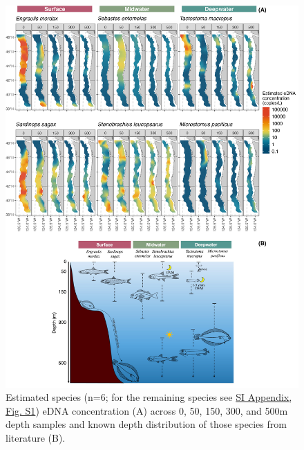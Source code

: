 \documentclass{article}
\begin{document}
\begin{figure}[tbhp]
\centering
\includegraphics[width=16cm]{plots/1_Figure_1.jpg} 
\caption{Estimated species (n=6; for the remaining species see \href{SI_Appendix.pdf}{SI Appendix, Fig. S1}) eDNA concentration (A) across 0, 50, 150, 300, and 500m depth samples and known depth distribution of those species from literature (B).}
\label{fig:fig1}
\end{figure}
\end{document}
